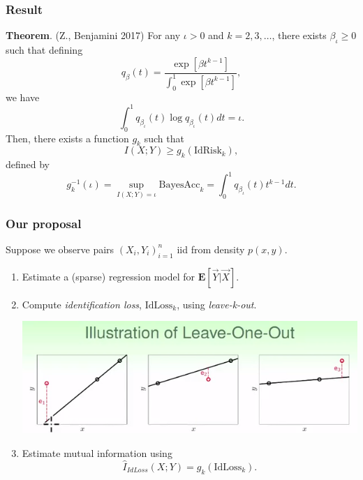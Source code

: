 \documentclass{beamer}
\newcommand{\E}{\textbf{E}}
\begin{document}
\begin{frame}
\frametitle{Result}
\textbf{Theorem}. (Z., Benjamini 2017)
For any $\iota > 0$ and $k = 2,3,\hdots$, there exists $\beta_\iota \geq 0$ such that defining
\[
q_\beta(t) = \frac{\exp[\beta t^{k-1}]}{\int_0^1 \exp[\beta t^{k-1}]},
\]
we have
\[
\int_0^1 q_{\beta_\iota}(t) \log q_{\beta_\iota}(t) dt = \iota.
\]
Then, there exists a function $g_k$ such that
\[I(X; Y) \geq g_k(\text{IdRisk}_k),\]
defined by
\[
g_k^{-1}(\iota) = \sup_{I(X; Y) = \iota} \text{BayesAcc}_k = \int_0^1 q_{\beta_\iota}(t) t^{k-1} dt.
\]
\end{frame}

\begin{frame}
\frametitle{Our proposal}
Suppose we observe pairs $(X_i,Y_i)_{i=1}^n$ iid from density $p(x, y)$.
\begin{enumerate}
\item Estimate a (sparse) regression model for $\E[\vec{Y}|\vec{X}]$.
\item Compute \emph{identification loss}, $\text{IdLoss}_k$, using \emph{leave-k-out}.
\begin{center}
\includegraphics[scale = 0.3]{loocv_sub.png}
\end{center}
\item Estimate mutual information using
\[
\hat{I}_{IdLoss}(X; Y) = g_k(\text{IdLoss}_k).
\]
\end{enumerate}
\end{frame}

\end{document}
